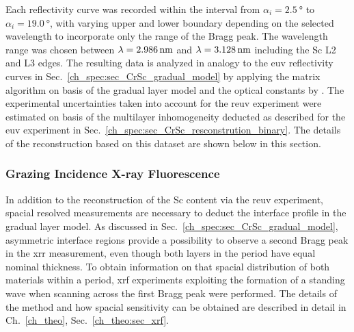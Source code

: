 Each reflectivity curve was recorded within the interval from $\alpha_i = \SI{2.5}{\degree}$ to $\alpha_i = \SI{19.0}{\degree}$, with varying upper and lower boundary depending on the selected wavelength to incorporate only the range of the Bragg peak. The wavelength range was chosen between $\lambda = \nm{2.986}$ and $\lambda = \nm{3.128}$ including the Sc L2 and L3 edges. The resulting data is analyzed in analogy to the \gls{euv} reflectivity curves in Sec.~\ref{ch_spec:sec_CrSc_gradual_model} by applying the matrix algorithm on basis of the gradual layer model and the optical constants by \textcite{aquila_measurements_2004}. The experimental uncertainties taken into account for the \gls{reuv} experiment were estimated on basis of the multilayer inhomogeneity deducted as described for the \gls{euv} experiment in Sec.~\ref{ch_spec:sec_CrSc_resconstrution_binary}. The details of the reconstruction based on this dataset are shown below in this section.

\subsubsection{Grazing Incidence X-ray Fluorescence}
In addition to the reconstruction of the Sc content via the \gls{reuv} experiment, spacial resolved measurements are necessary to deduct the interface profile in the gradual layer model. As discussed in Sec.~\ref{ch_spec:sec_CrSc_gradual_model}, asymmetric interface regions provide a possibility to observe a second Bragg peak in the \gls{xrr} measurement, even though both layers in the period have equal nominal thickness. To obtain information on that spacial distribution of both materials within a period, \gls{xrf} experiments exploiting the formation of a standing wave when scanning across the first Bragg peak were performed. The details of the method and how spacial sensitivity can be obtained are described in detail in Ch.~\ref{ch_theo}, Sec.~\ref{ch_theo:sec_xrf}.

